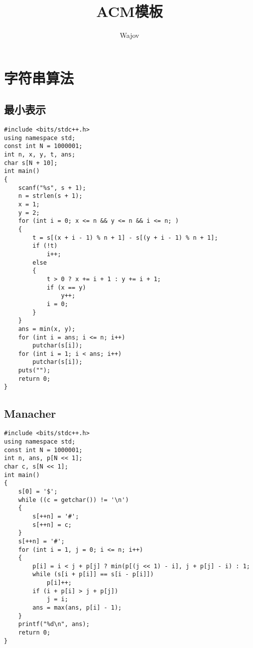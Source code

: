 \documentclass[a4paper]{article}
\title{ACM模板}
\author{Wajov}
\begin{document}
\maketitle
\renewcommand{\contentsname}{目录}
\tableofcontents
\newpage
\newfontfamily{}
\section{字符串算法}
\subsection{最小表示}
\begin{lstlisting}
#include <bits/stdc++.h>
using namespace std;
const int N = 1000001;
int n, x, y, t, ans;
char s[N + 10];
int main()
{
    scanf("%s", s + 1);
    n = strlen(s + 1);
    x = 1;
    y = 2;
    for (int i = 0; x <= n && y <= n && i <= n; )
    {
        t = s[(x + i - 1) % n + 1] - s[(y + i - 1) % n + 1];
        if (!t)
            i++;
        else
        {
            t > 0 ? x += i + 1 : y += i + 1;
            if (x == y)
                y++;
            i = 0;
        }
    }
    ans = min(x, y);
    for (int i = ans; i <= n; i++)
        putchar(s[i]);
    for (int i = 1; i < ans; i++)
        putchar(s[i]);
    puts("");
    return 0;
}
\end{lstlisting}
\subsection{Manacher}
\begin{lstlisting}
#include <bits/stdc++.h>
using namespace std;
const int N = 1000001;
int n, ans, p[N << 1];
char c, s[N << 1];
int main()
{
    s[0] = '$';
    while ((c = getchar()) != '\n')
    {
        s[++n] = '#';
        s[++n] = c;
    }
    s[++n] = '#';
    for (int i = 1, j = 0; i <= n; i++)
    {
        p[i] = i < j + p[j] ? min(p[(j << 1) - i], j + p[j] - i) : 1;
        while (s[i + p[i]] == s[i - p[i]])
            p[i]++;
        if (i + p[i] > j + p[j])
            j = i;
        ans = max(ans, p[i] - 1);
    }
    printf("%d\n", ans);
    return 0;
}
\end{lstlisting}
\end{document}
